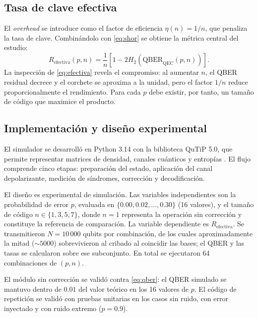 \documentclass[conference]{IEEEtran}
\begin{document}
\subsection{Tasa de clave efectiva}

El \textit{overhead} se introduce como el factor de eficiencia
$\eta(n)=1/n$, que penaliza la tasa de clave. Combinándolo con \eqref{eq:shor} se
obtiene la métrica central del estudio:
\begin{equation}
R_{\text{efectiva}}(p,n)
= \frac{1}{n}\left[1 - 2H_2\left(\mathrm{QBER}_{\text{QEC}}(p,n)\right)\right].
\label{eq:efectiva}
\end{equation}
La inspección de \eqref{eq:efectiva} revela el compromiso: al aumentar $n$, el
QBER residual decrece y el corchete se aproxima a la unidad, pero el factor $1/n$
reduce proporcionalmente el rendimiento. Para cada $p$ debe existir, por tanto,
un tamaño de código que maximice el producto.

\subsection{Implementación y diseño experimental}

El simulador se desarrolló en Python 3.14 con la biblioteca QuTiP 5.0, que
permite representar matrices de densidad, canales cuánticos y entropías
\cite{johansson2012}. El flujo comprende cinco etapas: preparación del estado,
aplicación del canal depolarizante, medición de síndromes, corrección y
decodificación.

El diseño es experimental de simulación. Las variables independientes son la
probabilidad de error $p$, evaluada en $\{0.00, 0.02,\ldots,0.30\}$ (16 valores),
y el tamaño de código $n \in \{1,3,5,7\}$, donde $n=1$ representa la operación
sin corrección y constituye la referencia de comparación. La variable dependiente
es $R_{\text{efectiva}}$. Se transmitieron $N=10\,000$ qubits por combinación, de
los cuales aproximadamente la mitad ($\sim 5000$) sobrevivieron al cribado al
coincidir las bases; el QBER y las tasas se calcularon sobre ese subconjunto. En
total se ejecutaron 64 combinaciones de $(p,n)$.

El módulo sin corrección se validó contra \eqref{eq:qber}: el QBER simulado se
mantuvo dentro de $0.01$ del valor teórico en los 16 valores de $p$. El código de
repetición se validó con pruebas unitarias en los casos sin ruido, con error
inyectado y con ruido extremo ($p=0.9$).

\end{document}

